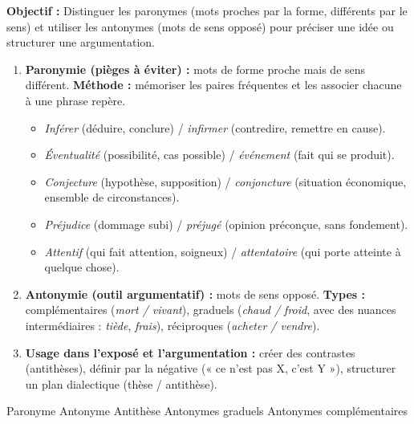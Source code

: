 \documentclass[11pt]{article}
\newcommand{\cle}[1]{{\popxbold\color{popdark}#1}}
\begin{document}
\begin{methode}
\textbf{Objectif :} Distinguer les paronymes (mots proches par la forme, différents par le sens) et utiliser les antonymes (mots de sens opposé) pour préciser une idée ou structurer une argumentation.
\begin{enumerate}
    \item \textbf{Paronymie (pièges à éviter) :} mots de forme proche mais de sens différent. \textbf{Méthode :} mémoriser les paires fréquentes et les associer chacune à une phrase repère.
    \begin{itemize}
        \item \emph{Inférer} (déduire, conclure) / \emph{infirmer} (contredire, remettre en cause).
        \item \emph{Éventualité} (possibilité, cas possible) / \emph{événement} (fait qui se produit).
        \item \emph{Conjecture} (hypothèse, supposition) / \emph{conjoncture} (situation économique, ensemble de circonstances).
        \item \emph{Préjudice} (dommage subi) / \emph{préjugé} (opinion préconçue, sans fondement).
        \item \emph{Attentif} (qui fait attention, soigneux) / \emph{attentatoire} (qui porte atteinte à quelque chose).
    \end{itemize}
    \item \textbf{Antonymie (outil argumentatif) :} mots de sens opposé. \textbf{Types :} complémentaires (\emph{mort / vivant}), graduels (\emph{chaud / froid}, avec des nuances intermédiaires : \emph{tiède}, \emph{frais}), réciproques (\emph{acheter / vendre}).
    \item \textbf{Usage dans l'exposé et l'argumentation :} créer des contrastes (antithèses), définir par la négative (« ce n'est pas X, c'est Y »), structurer un plan dialectique (thèse / antithèse).
\end{enumerate}
\cle{Paronyme} \cle{Antonyme} \cle{Antithèse} \cle{Antonymes graduels} \cle{Antonymes complémentaires}
\end{methode}
\end{document}

